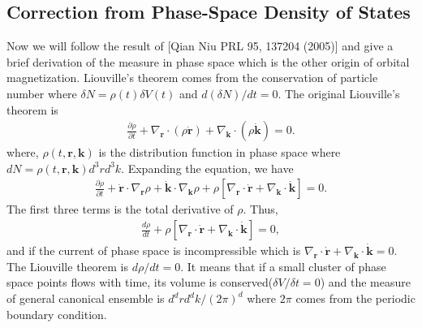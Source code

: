 \documentclass[12pt, oneside]{article}
\newcommand{\pa}{\partial}
\newcommand{\p}[1]{\left(#1\right)}
\newcommand{\bb}[1]{\left[#1\right]}
\numberwithin{equation}{subsection}
\begin{document}
\subsection{Correction from Phase-Space Density of States }
Now we will follow the result of [Qian Niu PRL 95, 137204 (2005)] and give a brief derivation of the measure in phase space which is the other origin of orbital magnetization. Liouville's theorem comes from the conservation of particle number where \(\delta N = \rho\p{t} \delta V\p{t}\) and \(d \p{\delta N} / d t = 0\). The original Liouville's theorem is 
\begin{align}
	\frac{\pa \rho}{\pa t} + \nabla_{\bm{r}} \cdot \p{\rho \dot{\bm{r}}} + \nabla_{\bm{k}} \cdot \p{\rho \dot{\bm{k}}} = 0.
\end{align}
where, \(\rho \p{t, \bm{r}, \bm{k}} \) is the distribution function in phase space where \(d N = \rho\p{t, \bm{r}, \bm{k}} d^3 r d^3 k\). Expanding the equation, we have 
\begin{align}
	\frac{\partial \rho}{\partial t} + \dot{\bm r}\cdot\nabla_{\bm r}\rho + \dot{\bm k}\cdot\nabla_{\bm k}\rho + \rho \left[ \nabla_{\bm r}\cdot\dot{\bm r} + \nabla_{\bm k}\cdot\dot{\bm k} \right] =0.
\end{align}
The first three terms is the total derivative of \(\rho\). Thus,
\begin{align}
	\frac{d \rho}{d t} + \rho \bb{\nabla_{\bm r}\cdot\dot{\bm r} + \nabla_{\bm k}\cdot\dot{\bm k}} = 0,
\end{align}
and if the current of phase space is incompressible which is \(\nabla_{\bm r}\cdot\dot{\bm r} + \nabla_{\bm k}\cdot\dot{\bm k} = 0\). The Liouville theorem is \(d \rho / d t = 0\). It means that if a small cluster of phase space points flows with time, its volume is conserved(\(\delta V/\delta t = 0\)) and the measure of general canonical ensemble is \(d^d r d^d k/\p{2 \pi}^{d} \) where \(2 \pi\) comes from the periodic boundary condition.
\end{document}
